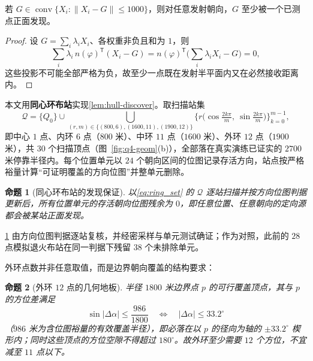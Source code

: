 \documentclass[withoutpreface]{cumcmthesis}
\newtheorem{proposition}{命题}
\begin{document}
\begin{lemma}[凸包发现证书]\label{lem:hull-discover}
若 $G\in\operatorname{conv}\{X_i:\|X_i-G\|\le1000\}$，则对任意发射朝向，$G$ 至少被一个已测点正面发现。
\end{lemma}
\begin{proof}
设 $G=\sum_i\lambda_iX_i$、各权重非负且和为 $1$，则
\[
\sum_i\lambda_i\,n(\varphi)^{\mathsf T}(X_i-G)
=n(\varphi)^{\mathsf T}\Big(\sum_i\lambda_iX_i-G\Big)=0,
\]
这些投影不可能全部严格为负，故至少一点既在发射半平面内又在必然接收距离内。
\end{proof}

本文用\textbf{同心环布站}实现\cref{lem:hull-discover}。取扫描站集
\begin{equation}\label{eq:ring_set}
\mathcal Q=\{Q_0\}\cup\bigcup_{(r,m)\in\{(800,6),(1600,11),(1900,12)\}}
\Big\{r\Big(\cos\tfrac{2k\pi}{m},\ \sin\tfrac{2k\pi}{m}\Big)\Big\}_{k=0}^{m-1},
\end{equation}
即中心 $1$ 点、内环 $6$ 点（$800$ 米）、中环 $11$ 点（$1600$ 米）、外环 $12$ 点（$1900$ 米），共 $30$ 个扫描顶点（图~\cref{fig:q4-geom}(b)），全部落在真实演练已证实的 $2700$ 米停靠半径内。每个位置单元以 $24$ 个朝向区间的位图记录存活方向，站点按严格裕量计算“可证明覆盖的方向位图”并整单元删除。

\begin{proposition}[同心环布站的发现保证]\label{prop:ring-layout}
以\cref{eq:ring_set} 的 $\mathcal Q$ 逐站扫描并按方向位图判据更新后，所有位置单元的存活朝向位图残余为 $0$，即任意位置、任意朝向的定向源都会被某站正面发现。
\end{proposition}

\cref{prop:ring-layout} 由方向位图判据逐站复核，并经密采样与单元测试确证；作为对照，此前的 $28$ 点模拟退火布站在同一判据下残留 $38$ 个未排除单元。

外环点数并非任意取值，而是边界朝向覆盖的结构要求：

\begin{proposition}[外环 $12$ 点的几何地板]\label{prop:outer-ring}
半径 $1800$ 米边界点 $p$ 的可行覆盖顶点，其与 $p$ 的方位差满足
\begin{equation}\label{eq:wedge}
\sin|\Delta\alpha|\le\frac{986}{1800}
\quad\Longleftrightarrow\quad
|\Delta\alpha|\le33.2^\circ
\end{equation}
（$986$ 米为含位图裕量的有效覆盖半径），即必落在以 $p$ 的径向为轴的 $\pm33.2^\circ$ 楔形内；同时这些顶点的方位空隙不得超过 $180^\circ$。故外环至少需要 $12$ 个方位，不宜减至 $11$ 点以下。
\end{proposition}
\end{document}
